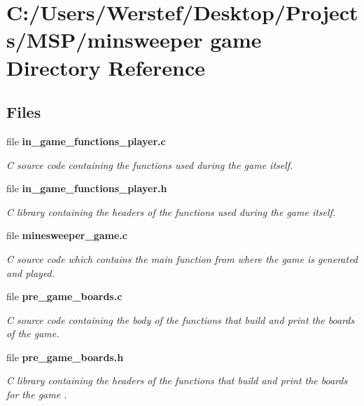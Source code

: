 \section{C\+:/\+Users/\+Werstef/\+Desktop/\+Projects/\+M\+S\+P/minsweeper game Directory Reference}
\label{dir_a6bea997f3f8a30f5ba3f7b91788eaee}
\subsection*{Files}
\begin{DoxyCompactItemize}
\item 
file \textbf{ in\+\_\+game\+\_\+functions\+\_\+player.\+c}
\begin{DoxyCompactList}\small\item\em C source code containing the functions used during the game itself. \end{DoxyCompactList}\item 
file \textbf{ in\+\_\+game\+\_\+functions\+\_\+player.\+h}
\begin{DoxyCompactList}\small\item\em C library containing the headers of the functions used during the game itself. \end{DoxyCompactList}\item 
file \textbf{ minesweeper\+\_\+game.\+c}
\begin{DoxyCompactList}\small\item\em C source code which contains the main function from where the game is generated and played. \end{DoxyCompactList}\item 
file \textbf{ pre\+\_\+game\+\_\+boards.\+c}
\begin{DoxyCompactList}\small\item\em C source code containing the body of the functions that build and print the boards of the game. \end{DoxyCompactList}\item 
file \textbf{ pre\+\_\+game\+\_\+boards.\+h}
\begin{DoxyCompactList}\small\item\em C library containing the headers of the functions that build and print the boards for the game . \end{DoxyCompactList}\end{DoxyCompactItemize}
